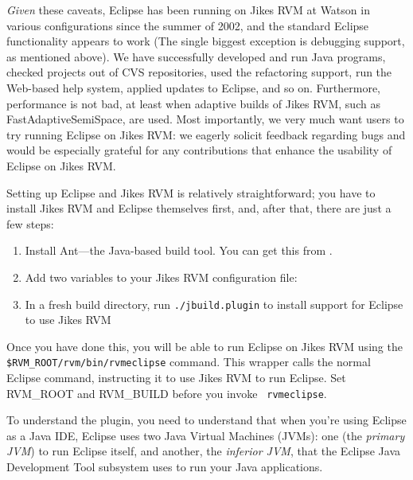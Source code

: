 {\it Given} these caveats, Eclipse has been running on Jikes RVM at
Watson in various configurations since the summer of 2002, and the
standard Eclipse functionality appears to work (The single biggest
exception is debugging support, as mentioned above).  We have
successfully developed and run Java programs, checked projects out of
CVS repositories, used the refactoring support, run the Web-based help
system, applied updates to Eclipse, and so on.  Furthermore,
performance is not bad, at least when adaptive builds of Jikes RVM,
such as FastAdaptiveSemiSpace, are used.  Most importantly, we very
much want users to try running Eclipse on Jikes RVM: we eagerly
solicit feedback regarding bugs and would be especially grateful for
any contributions that enhance the usability of Eclipse on Jikes RVM.

Setting up Eclipse and Jikes RVM is relatively straightforward; you
have to install Jikes RVM and Eclipse themselves first, and, after
that, there are just a few steps:
\begin{enumerate}
\item Install Ant---the Java-based build tool.  You can get this from
\xlink{{\tt \antURL}}{\antURL}. 
\item Add two variables to your Jikes RVM configuration file:
\item In a fresh build directory, run {\tt ./jbuild.plugin} to install
support for Eclipse to use Jikes RVM
\end{enumerate}

Once you have done this, you will be able to run Eclipse on Jikes RVM
using the {\tt \$RVM\_ROOT/rvm/bin/rvmeclipse} command.  This wrapper
calls the normal Eclipse command, instructing it to use Jikes RVM to
run Eclipse.  Set RVM\_ROOT and RVM\_BUILD before you invoke {\tt
rvmeclipse}.

To understand the plugin, you need to understand that when you're
using Eclipse as a Java IDE, Eclipse uses two Java Virtual Machines
(JVMs): one (the {\em primary JVM}) to run Eclipse itself, and
another, the {\em inferior JVM}, that the Eclipse Java Development
Tool subsystem uses to run your Java applications.

